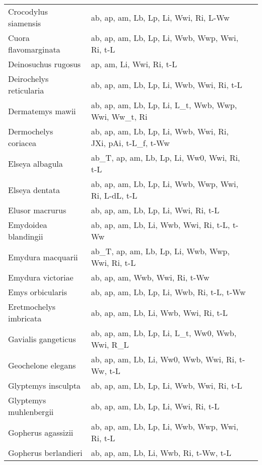 \documentclass{article}
\begin{document}
{\begin{longtable}[c]{p{3.5cm}p{5.5cm}p{5.5cm}}
Crocodylus siamensis &  ab, ap, am, Lb, Lp, Li, Wwi, Ri, L-Ww & \citet{PlatNomy2012,ChenHugg1983} \\
Cuora flavomarginata &  ab, ap, am, Lb, Lp, Li, Wwb, Wwp, Wwi, Ri, t-L & \citet{ChenLue2002} \\
Deinosuchus rugosus &  ap, am, Li, Wwi, Ri, t-L & \citet{EricBroc1999} \\
Deirochelys reticularia &  ab, ap, am, Lb, Lp, Li, Wwb, Wwi, Ri, t-L & \citet{BuhlCond2009} \\
Dermatemys mawii &  ab, ap, am, Lb, Lp, Li, L\_t, Wwb, Wwp, Wwi, Ww\_t, Ri & \citet{LeglVogt2013} \\
Dermochelys coriacea &  ab, ap, am, Lb, Lp, Li, Wwb, Wwi, Ri, JXi, pAi, t-L\_f, t-Ww & \citet{Jone2009} \\
Elseya albagula &  ab\_T, ap, am, Lb, Lp, Li, Ww0, Wwi, Ri, t-L & \citet{Limp2008} \\
Elseya dentata &  ab, ap, am, Lb, Lp, Li, Wwb, Wwp, Wwi, Ri, L-dL, t-L & \citet{ErnsBarb1989,Kenn1996} \\
Elusor macrurus &  ab, ap, am, Lb, Lp, Li, Wwi, Ri, t-L & \citet{Limp2008} \\
Emydoidea blandingii &  ab, ap, am, Lb, Li, Wwb, Wwi, Ri, t-L, t-Ww & \citet{CongLobe1991} \\
Emydura macquarii &  ab\_T, ap, am, Lb, Lp, Li, Wwb, Wwp, Wwi, Ri, t-L & \citet{Spen2002} \\
Emydura victoriae &  ab, ap, am, Wwb, Wwi, Ri, t-Ww & \citet{GaikClar2011,Jone2003} \\
Emys orbicularis &  ab, ap, am, Lb, Lp, Li, Wwb, Ri, t-L, t-Ww & \citet{MasiFice2015} \\
Eretmochelys imbricata &  ab, ap, am, Lb, Li, Wwb, Wwi, Ri, t-L & \citet{Witz1980,BellPike1980} \\
Gavialis gangeticus &  ab, ap, am, Lb, Lp, Li, L\_t, Ww0, Wwb, Wwi, R\_L & \\
Geochelone elegans &  ab, ap, am, Lb, Li, Ww0, Wwb, Wwi, Ri, t-Ww, t-L & \citet{Vyas1997} \\
Glyptemys insculpta &  ab, ap, am, Lb, Lp, Li, Wwb, Wwi, Ri, t-L & \citet{MarcHugh2018} \\
Glyptemys muhlenbergii &  ab, ap, am, Lb, Lp, Li, Wwi, Ri, t-L & \citet{LoviErns1998} \\
Gopherus agassizii &  ab, ap, am, Lb, Lp, Li, Wwb, Wwp, Wwi, Ri, t-L & \citet{MediNuss2012,ErnsBarb1989} \\
Gopherus berlandieri &  ab, ap, am, Lb, Li, Wwb, Ri, t-Ww, t-L & \citet{JuddMcQu1980} \\

\end{longtable}}
\end{document}
